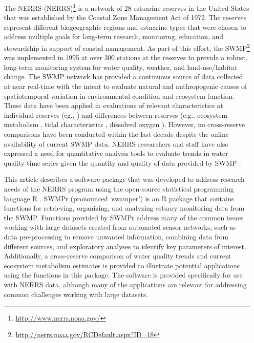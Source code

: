 \documentclass[10pt,letterpaper]{article}\usepackage[]{graphicx}\usepackage[]{color}
\begin{document}
The \acl{NERRS} (\acs{NERRS})\footnote{\url{http://www.nerrs.noaa.gov/}} is a network of 28 estuarine reserves in the United States that was established by the Coastal Zone Management Act of 1972.  The reserves represent different biogeographic regions and estuarine types that were chosen to address multiple goals for long-term research, monitoring, education, and stewardship in support of coastal management.  As part of this effort, the \acf{SWMP}\footnote{\url{http://nerrs.noaa.gov/RCDefault.aspx?ID=18}} was implemented in 1995 at over 300 stations at the reserves to provide a robust, long-term monitoring system for water quality, weather, and land-use/habitat change.  The \ac{SWMP} network has provided a continuous source of data collected at near real-time with the intent to evaluate natural and anthropogenic causes of spatiotemporal variation in environmental condition and ecosystem function.  These data have been applied in evaluations of relevant characteristics at individual reserves (eg., \cite{Bulthius95,Dix08}) and differences between reserves (e.g., ecosystem metabolism \cite{Caffrey03,Caffrey04}, tidal characteristics \cite{Sanger02}, dissolved oxygen \cite{Wenner04}).  However, no cross-reserve comparisons have been conducted within the last decade despite the online availability of current \ac{SWMP} data.  \ac{NERRS} researchers and staff have also expressed a need for quantitative analysis tools to evaluate trends in water quality time series given the quantity and quality of data provided by \ac{SWMP} \cite{SWMP14}.          

This article describes a software package that was developed to address research needs of the \ac{NERRS} program using the open-source statistical programming language R \cite{RDCT14}.  SWMPr (pronounced `swamper') is an R package that contains functions for retrieving, organizing, and analyzing estuary monitoring data from the \acl{SWMP}.  Functions provided by SWMPr address many of the common issues working with large datasets created from automated sensor networks, such as data pre-processing to remove unwanted information, combining data from different sources, and exploratory analyses to identify key parameters of interest.  Additionally, a cross-reserve comparison of water quality trends and current ecosystem metabolism estimates is provided to illustrate potential applications using the functions in this package.  The software is provided specifically for use with \ac{NERRS} data, although many of the applications are relevant for addressing common challenges working with large datasets.
\end{document}

